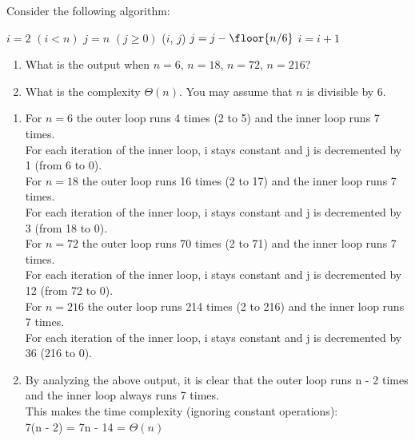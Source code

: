 \documentclass[addpoints,11pt]{exam}
\begin{document}
\begin{questions}
		
		\question[5]
		Consider the following algorithm:
		\begin{codebox}
			\li $i=2$
			\li \While $(i<n)$ \Do
			\li 	$j=n$
			\li 	\While $(j\ge 0)$ \Do
			\li 		\proc{Print}($i$, $j$)
			\li 		$j = j - \floor{n/6}$
			\End
			\li 	$i = i + 1$
			\End
			\End
		\end{codebox}
		
		\begin{enumerate}[label=(\roman*)]
			\item What is the output when $n=6$, $n=18$, $n=72$, $n=216$?
			\item What is the complexity $\Theta(n)$.  You may assume that $n$ is divisible by 6.
		\end{enumerate}
		
		\begin{solutionorbox}
			\begin{enumerate}[label=(\roman*)]
				\item For $n=6$ the outer loop runs 4 times (2 to 5) and the inner loop runs 7 times.\\
				For each iteration of the inner loop, i stays constant and j is decremented by 1 (from 6 to 0).\\
				For $n = 18$ the outer loop runs 16 times (2 to 17) and the inner loop runs 7 times.\\
				For each iteration of the inner loop, i stays constant and j is decremented by 3 (from 18 to 0).\\
				For $n = 72$ the outer loop runs 70 times (2 to 71) and the inner loop runs 7 times.\\
				For each iteration of the inner loop, i stays constant and j is decremented by 12 (from 72 to 0).\\
				For $n = 216$ the outer loop runs 214 times (2 to 216) and the inner loop runs 7 times.\\
				For each iteration of the inner loop, i stays constant and j is decremented by 36 (216 to 0).
				\item By analyzing the above output, it is clear that the outer loop runs n - 2 times and the inner loop always runs 7 times.\\
				This makes the time complexity (ignoring constant operations):\\ 7(n - 2) = 7n - 14 = $\Theta(n)$
			\end{enumerate}
		\end{solutionorbox}
		
		\ifprintanswers
		\newpage
		\else
		\bigskip
		\fi
		
	\end{questions}
\end{document}
